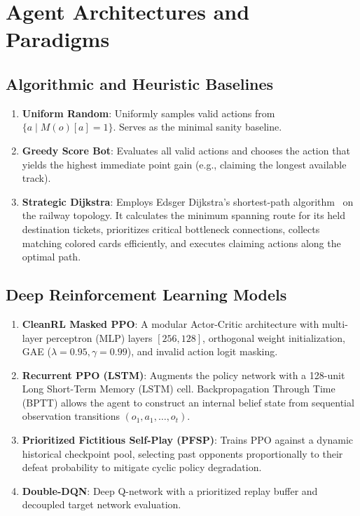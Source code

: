 \documentclass[conference,10pt]{IEEEtran}
\begin{document}
\section{Agent Architectures and Paradigms}
\label{sec:agents}

\subsection{Algorithmic and Heuristic Baselines}
\begin{enumerate}
    \item \textbf{Uniform Random}: Uniformly samples valid actions from $\{a \mid M(o)[a] = 1\}$. Serves as the minimal sanity baseline.
    \item \textbf{Greedy Score Bot}: Evaluates all valid actions and chooses the action that yields the highest immediate point gain (e.g., claiming the longest available track).
    \item \textbf{Strategic Dijkstra}: Employs Edsger Dijkstra's shortest-path algorithm~\cite{dijkstra1959note} on the railway topology. It calculates the minimum spanning route for its held destination tickets, prioritizes critical bottleneck connections, collects matching colored cards efficiently, and executes claiming actions along the optimal path.
\end{enumerate}

\subsection{Deep Reinforcement Learning Models}
\begin{enumerate}
    \item \textbf{CleanRL Masked PPO}: A modular Actor-Critic architecture with multi-layer perceptron (MLP) layers $[256, 128]$, orthogonal weight initialization, GAE ($\lambda=0.95, \gamma=0.99$), and invalid action logit masking.
    \item \textbf{Recurrent PPO (LSTM)}: Augments the policy network with a 128-unit Long Short-Term Memory (LSTM) cell. Backpropagation Through Time (BPTT) allows the agent to construct an internal belief state from sequential observation transitions $(o_1, a_1, \dots, o_t)$.
    \item \textbf{Prioritized Fictitious Self-Play (PFSP)}: Trains PPO against a dynamic historical checkpoint pool, selecting past opponents proportionally to their defeat probability to mitigate cyclic policy degradation.
    \item \textbf{Double-DQN}: Deep Q-network with a prioritized replay buffer and decoupled target network evaluation.
\end{enumerate}
\end{document}
